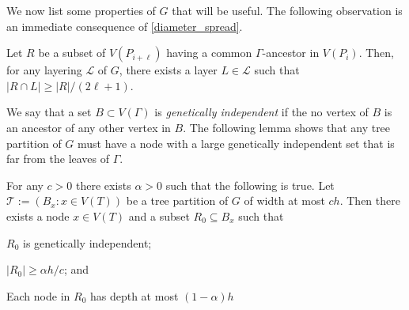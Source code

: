 \documentclass{patmorin}
\newcommand{\defin}[1]{\emph{\color{brightmaroon}#1}}
\begin{document}
We now list some properties of $G$ that will be useful.  The following observation is an immediate consequence of \cref{diameter_spread}.

\begin{obs}\label{ancestor_spread}
  Let $R$ be a subset of $V(P_{i+\ell})$ having a common $\Gamma$-ancestor in $V(P_i)$.  Then, for any layering $\mathcal{L}$ of $G$, there exists a layer $L\in\mathcal{L}$ such that $|R\cap L|\ge |R|/(2\ell+1)$. 
\end{obs}

We say that a set $B\subset V(\Gamma)$ is \defin{genetically independent} if the no vertex of $B$ is an ancestor of any other vertex in $B$.  The following lemma shows that any tree partition of $G$ must have a node with a large genetically independent set that is far from the leaves of $\Gamma$.

\begin{lem}\label{startup}
  For any $c>0$ there exists $\alpha>0$ such that the following is true.
  Let $\mathcal{T}:=(B_x:x\in V(T))$ be a tree partition of $G$ of width at most $ch$.  Then there exists a node $x\in V(T)$ and a subset $R_0\subseteq B_x$ such that
  \begin{compactenum}[(i)]
    \item $R_0$ is genetically independent;
    \item $|R_0|\ge \alpha h/c$; and
    \item Each node in $R_0$ has depth at most $(1-\alpha)h$ 
  \end{compactenum}
\end{lem}

\end{document}
